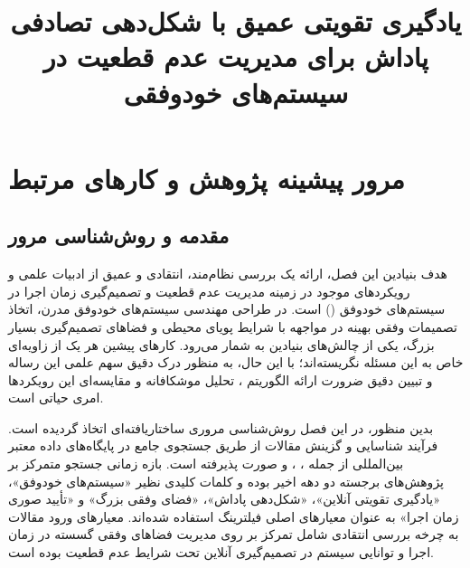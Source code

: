 \documentclass[oneside,openany,phd]{TMU-Thesis}
\title{یادگیری تقویتی عمیق با شکل‌دهی تصادفی پاداش برای مدیریت عدم قطعیت در سیستم‌های خودوفقی}
\begin{document}
\AutoPersianDigits
{}

\setcounter{chapter}{2}

\chapter{مرور پیشینه پژوهش و کارهای مرتبط}

\section{مقدمه و روش‌شناسی مرور}
\label{sec:ch3_intro}

هدف بنیادین این فصل، ارائه یک بررسی نظام‌مند، انتقادی و عمیق از ادبیات علمی و رویکردهای موجود در زمینه مدیریت عدم قطعیت و تصمیم‌گیری زمان اجرا در سیستم‌های خودوفق () است. در طراحی مهندسی سیستم‌های خودوفق مدرن، اتخاذ تصمیمات وفقی بهینه در مواجهه با شرایط پویای محیطی و فضاهای تصمیم‌گیری بسیار بزرگ، یکی از چالش‌های بنیادین به شمار می‌رود. کارهای پیشین هر یک از زاویه‌ای خاص به این مسئله نگریسته‌اند؛ با این حال، به منظور درک دقیق سهم علمی این رساله و تبیین دقیق ضرورت ارائه الگوریتم ، تحلیل موشکافانه و مقایسه‌ای این رویکردها امری حیاتی است.

بدین منظور، در این فصل روش‌شناسی مروری ساختاریافته‌ای اتخاذ گردیده است. فرآیند شناسایی و گزینش مقالات از طریق جستجوی جامع در پایگاه‌های داده معتبر بین‌المللی از جمله ، ،  و  صورت پذیرفته است. بازه زمانی جستجو متمرکز بر پژوهش‌های برجسته دو دهه اخیر بوده و کلمات کلیدی نظیر «سیستم‌های خودوفق»، «یادگیری تقویتی آنلاین»، «شکل‌دهی پاداش»، «فضای وفقی بزرگ» و «تأیید صوری زمان اجرا» به عنوان معیارهای اصلی فیلترینگ استفاده شده‌اند. معیارهای ورود مقالات به چرخه بررسی انتقادی شامل تمرکز بر روی مدیریت فضاهای وفقی گسسته در زمان اجرا و توانایی سیستم در تصمیم‌گیری آنلاین تحت شرایط عدم قطعیت بوده است.
\end{document}
